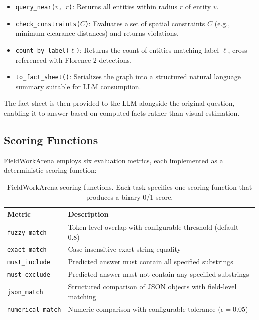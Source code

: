 \documentclass[11pt]{article}
\begin{document}
\begin{itemize}[leftmargin=*,itemsep=1pt]
  \item \texttt{query\_near($v$, $r$)}: Returns all entities within radius $r$ of entity $v$.
  \item \texttt{check\_constraints($C$)}: Evaluates a set of spatial constraints $C$ (e.g., minimum clearance distances) and returns violations.
  \item \texttt{count\_by\_label($\ell$)}: Returns the count of entities matching label $\ell$, cross-referenced with Florence-2 detections.
  \item \texttt{to\_fact\_sheet()}: Serializes the graph into a structured natural language summary suitable for LLM consumption.
\end{itemize}

The fact sheet is then provided to the LLM alongside the original question, enabling it to answer based on computed facts rather than visual estimation.

\subsection{Scoring Functions}

FieldWorkArena employs six evaluation metrics, each implemented as a deterministic scoring function:

\begin{table}[t]
\centering
\caption{FieldWorkArena scoring functions. Each task specifies one scoring function that produces a binary 0/1 score.}
\label{tab:scoring}
\begin{tabular}{@{}lp{8cm}@{}}
\toprule
\textbf{Metric} & \textbf{Description} \\
\midrule
\texttt{fuzzy\_match}     & Token-level overlap with configurable threshold (default 0.8) \\
\texttt{exact\_match}     & Case-insensitive exact string equality \\
\texttt{must\_include}    & Predicted answer must contain all specified substrings \\
\texttt{must\_exclude}    & Predicted answer must not contain any specified substrings \\
\texttt{json\_match}      & Structured comparison of JSON objects with field-level matching \\
\texttt{numerical\_match} & Numeric comparison with configurable tolerance ($\epsilon = 0.05$) \\
\bottomrule
\end{tabular}
\end{table}
\end{document}

